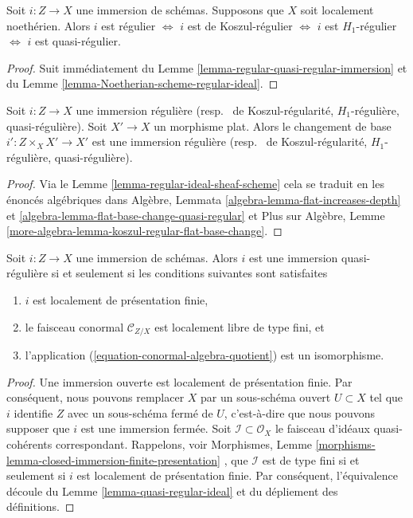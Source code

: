 \begin{lemma}
\label{lemma-regular-immersion-noetherian}
Soit  $i : Z \to X$  une immersion de schémas. Supposons que  $X$  soit
localement noethérien. Alors  $i$  est régulier  $\Leftrightarrow$   $i$ 
est de Koszul-régulier  $\Leftrightarrow$   $i$  est  $H_1$-régulier
 $\Leftrightarrow$   $i$  est quasi-régulier.
\end{lemma}

\begin{proof}
Suit immédiatement du Lemme  \ref{lemma-regular-quasi-regular-immersion}  et du Lemme  \ref{lemma-Noetherian-scheme-regular-ideal}.
\end{proof}

\begin{lemma}
\label{lemma-flat-base-change-regular-immersion}
Soit  $i : Z \to X$  une immersion régulière (resp. \  de
Koszul-régularité,  $H_1$-régulière, quasi-régulière). Soit  $X' \to X$  un
morphisme plat. Alors le changement de base  $i' : Z \times_X X' \to X'$  est une immersion
régulière (resp. \  de Koszul-régularité,  $H_1$-régulière,
quasi-régulière).
\end{lemma}

\begin{proof}
Via le Lemme  \ref{lemma-regular-ideal-sheaf-scheme}  cela se traduit en les énoncés algébriques dans Algèbre,
Lemmata  \ref{algebra-lemma-flat-increases-depth}  et  \ref{algebra-lemma-flat-base-change-quasi-regular}  et Plus sur Algèbre, Lemme  \ref{more-algebra-lemma-koszul-regular-flat-base-change}.
\end{proof}

\begin{lemma}
\label{lemma-quasi-regular-immersion}
Soit  $i : Z \to X$  une immersion de schémas. Alors  $i$  est une immersion
quasi-régulière si et seulement si les conditions suivantes sont satisfaites
\begin{enumerate}
\item $i$  est localement de présentation finie,
\item le faisceau conormal  $\mathcal{C}_{Z/X}$  est localement libre de type fini, et
\item l'application (\ref{equation-conormal-algebra-quotient}) est un isomorphisme.
\end{enumerate}
\end{lemma}

\begin{proof}
Une immersion ouverte est localement de présentation finie. Par conséquent, nous
pouvons remplacer  $X$  par un sous-schéma ouvert  $U \subset X$  tel que
 $i$  identifie  $Z$  avec un sous-schéma fermé de  $U$,
c’est-à-dire que nous pouvons supposer que  $i$  est une immersion fermée.
Soit  $\mathcal{I} \subset \mathcal{O}_X$  le faisceau d'idéaux quasi-cohérents correspondant. Rappelons,
voir Morphismes, Lemme  \ref{morphisms-lemma-closed-immersion-finite-presentation} , que  $\mathcal{I}$  est de type fini si et
seulement si  $i$  est localement de présentation finie. Par conséquent,
l'équivalence découle du Lemme  \ref{lemma-quasi-regular-ideal}  et du dépliement des définitions.
\end{proof}

